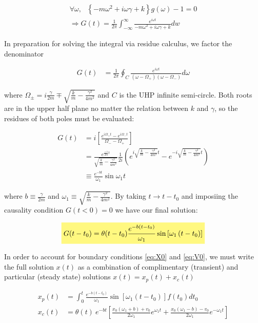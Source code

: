 \documentclass[11pt]{article}
\theoremstyle{plain}
\theoremstyle{definition}
\newcommand{\highlight}[1]{%
  \colorbox{yellow!50}{$\displaystyle#1$}}
\begin{document}
\begin{align}
    \forall \omega, \ \ \ \left\{ -m\omega^2 + i\omega \gamma + k \right\}g(\omega) - 1 = 0 \\
    \Rightarrow G(t) = \frac{1}{2\pi} \int_{-\infty}^{\infty} \frac{e^{i\omega t}}{-m\omega^2 + i\omega \gamma + k} dw
\end{align}

In preparation for solving the integral via residue calculus, we factor the denominator

\begin{align}
    G(t) &= \frac{1}{2\pi}\oint_C \frac{e^{i\omega t}}{\left( \omega-\Omega_+ \right) \left( \omega - \Omega_- \right)} d\omega
\end{align}

where $\Omega_{\pm} = i\frac{\gamma}{2m} \mp \sqrt{\frac{k}{m}-\frac{\gamma^2}{4m^2}}$ and $C$ is the UHP infinite semi-circle.  Both roots are in the upper half plane no matter the relation between $k$ and $\gamma$, so the residues of both poles must be evaluated:

\begin{align}
    G(t) &= i \left[ \frac{e^{i\Omega_+ t} - e^{i \Omega_- t}}{\Omega_- - \Omega_+} \right] \\
    &= \frac{e^{\frac{-\gamma}{2m} t}}{\sqrt{\frac{k}{m}-\frac{\gamma^2}{4m^2}}} \frac{1}{2i} \left( e^{i \sqrt{\frac{k}{m}-\frac{\gamma^2}{4m^2}} t} - e^{-i \sqrt{\frac{k}{m}-\frac{\gamma^2}{4m^2}} t} \right) \\
    &\equiv \frac{e^{-bt}}{\omega_1}\sin{\omega_1 t}
\end{align}

where $b \equiv \frac{\gamma}{2m}$ and $\omega_1 \equiv \sqrt{\frac{k}{m}-\frac{\gamma^2}{4m^2}}$. By taking $t \rightarrow t-t_0$ and imposiing  the causality condition $G(t<0)=0$ we have our final solution:


\begin{align}
    \highlight{G(t-t_0) = \theta(t-t_0) \frac{e^{-b\left( t-t_0 \right)}}{\omega_1}\sin\left[ \omega_1 \left( t-t_0 \right) \right]}
\end{align}

In order to account for boundary conditions \eqref{eq:X0} and \eqref{eq:V0}, we must write the full solution $x(t)$ as a combination of complimentary (transient) and particular (steady state) solutions $x(t) = x_p(t) + x_c(t)$

\begin{align}
    x_p(t) &= \int_{0}^{t} \frac{e^{-b\left( t-t_0 \right)}}{\omega_1}\sin\left[ \omega_1 \left( t-t_0 \right) \right] f(t_0) dt_0 \\
    x_c(t) &=\theta(t) \  e^{-bt}\left[ \frac{x_0\left( \omega_1+b \right)+v_0  }{2\omega_1}e^{\omega_1 t} + \frac{x_0\left( \omega_1-b \right)-v_0  }{2\omega_1}e^{-\omega_1 t} \right]
\end{align}
\end{document}
